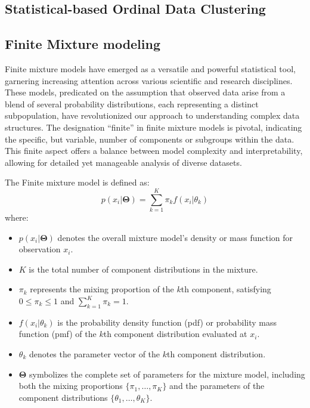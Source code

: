 \documentclass{article}
\begin{document}
\subsection{Statistical-based Ordinal Data Clustering}

\subsection*{Finite Mixture modeling}

Finite mixture models have emerged as a versatile and powerful statistical tool, garnering increasing attention across various scientific and research disciplines. These models, predicated on the assumption that observed data arise from a blend of several probability distributions, each representing a distinct subpopulation, have revolutionized our approach to understanding complex data structures. The designation ``finite'' in finite mixture models is pivotal, indicating the specific, but variable, number of components or subgroups within the data. This finite aspect offers a balance between model complexity and interpretability, allowing for detailed yet manageable analysis of diverse datasets.

The Finite mixture model is defined as:
\begin{equation}
p(x_i|\mathbf{\Theta}) = \sum_{k=1}^{K} \pi_k f(x_i|\theta_k)
\end{equation}
where:
\begin{itemize}
    \item $p(x_i|\mathbf{\Theta})$ denotes the overall mixture model's density or mass function for observation $x_i$.
    \item $K$ is the total number of component distributions in the mixture.
    \item $\pi_k$ represents the mixing proportion of the $k$th component, satisfying $0 \leq \pi_k \leq 1$ and $\sum_{k=1}^{K} \pi_k = 1$.
    \item $f(x_i|\theta_k)$ is the probability density function (pdf) or probability mass function (pmf) of the $k$th component distribution evaluated at $x_i$.
    \item $\theta_k$ denotes the parameter vector of the $k$th component distribution.
    \item $\mathbf{\Theta}$ symbolizes the complete set of parameters for the mixture model, including both the mixing proportions $\{\pi_1, \ldots, \pi_K\}$ and the parameters of the component distributions $\{\theta_1, \ldots, \theta_K\}$.
\end{itemize}
\end{document}
